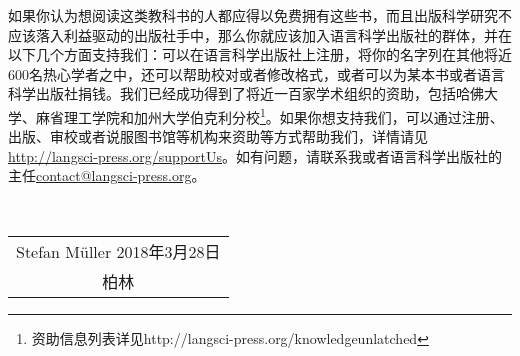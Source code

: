 
如果你认为想阅读这类教科书的人都应得以免费拥有这些书，而且出版科学研究不应该落入利益驱动的出版社手中，那么你就应该加入语言科学出版社的群体，并在以下几个方面支持我们：可以在语言科学出版社上注册，将你的名字列在其他将近600名热心学者之中，还可以帮助校对或者修改格式，或者可以为某本书或者语言科学出版社捐钱。我们已经成功得到了将近一百家学术组织的资助，包括哈佛大学、麻省理工学院和加州大学伯克利分校\footnote{资助信息列表详见http://langsci-press.org/knowledgeunlatched
}。如果你想支持我们，可以通过注册、出版、审校或者说服图书馆等机构来资助等方式帮助我们，详情请见\url{http://langsci-press.org/supportUs}。如有问题，请联系我或者语言科学出版社的主任\href{mailto:contact@langsci-press.org}{contact@langsci-press.org}。


~\medskip

\begin{flushright}
\begin{tabular}{c}
Stefan Müller
2018年3月28日\\
柏林\\
\end{tabular}
\end{flushright}

